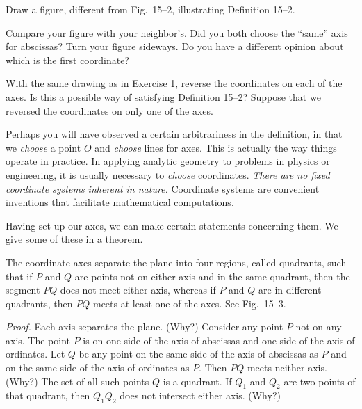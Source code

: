 \documentclass[11pt]{book}
\theoremstyle{bkplain}
\begin{document}
\FIGXVTWO

\begin{exercisecols}
\begin{exlist}
\item Draw a figure, different from Fig.~15--2, illustrating Definition
  15--2.
\item Compare your figure with your neighbor's. Did you both choose the
  ``same'' axis for abscissas? Turn your figure sideways. Do you have a
  different opinion about which is the first coordinate?
\item With the same drawing as in Exercise 1, reverse the coordinates on each
  of the axes. Is this a possible way of satisfying Definition 15--2? Suppose
  that we reversed the coordinates on only one of the axes.
\end{exlist}
\end{exercisecols}

Perhaps you will have observed a certain arbitrariness in the definition, in
that we \emph{choose} a point $O$ and \emph{choose} lines for axes. This is
actually the way things operate in practice. In applying analytic geometry to
problems in physics or engineering, it is usually necessary to \emph{choose}
coordinates. \emph{There are no fixed coordinate systems inherent in nature.}
Coordinate systems are convenient inventions that facilitate mathematical
computations.

Having set up our axes, we can make certain statements concerning them. We
give some of these in a theorem.

\begin{theorem}
The coordinate axes separate the plane into four regions, called quadrants,
such that if $P$ and $Q$ are points not on either axis and in the same
quadrant, then the segment $PQ$ does not meet either axis, whereas if $P$ and
$Q$ are in different quadrants, then $PQ$ meets at least one of the axes. See
Fig.~15--3.
\end{theorem}

\FIGXVTHREE

\noindent\emph{Proof.}
Each axis separates the plane. (Why?) Consider any point $P$ not on any axis.
The point $P$ is on one side of the axis of abscissas and one side of the axis
of ordinates. Let $Q$ be any point on the same side of the axis of abscissas
as $P$ and on the same side of the axis of ordinates as $P$. Then $PQ$ meets
neither axis. (Why?) The set of all such points $Q$ is a quadrant. If $Q_1$
and $Q_2$ are two points of that quadrant, then $Q_1Q_2$ does not intersect
either axis. (Why?)
\end{document}
